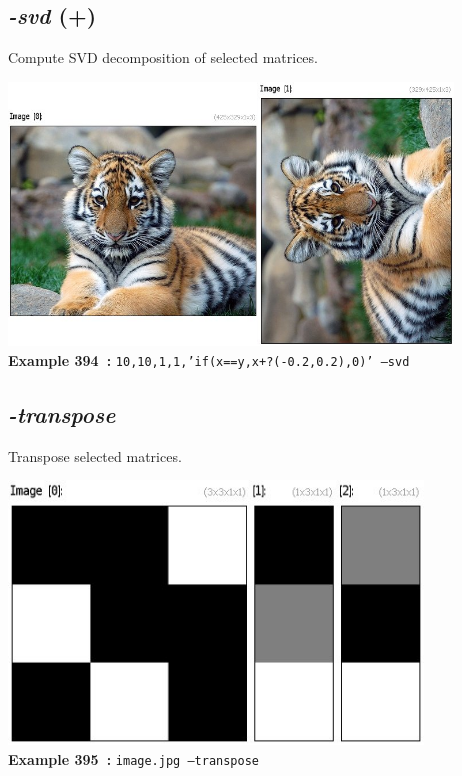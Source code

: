 \documentclass[a4paper,11pt,twoside]{book}
\begin{document}
\subsection{\emph{-svd} (+)}\vspace*{-0.5em}
Compute SVD decomposition of selected matrices.
\begin{center}\includegraphics[keepaspectratio=true,height=7cm,width=\textwidth]{img/gmic_def394.jpg}\\
{\footnotesize \textbf{Example 394~:} \texttt{10,10,1,1,'if(x==y,x+?(-0.2,0.2),0)' --svd}}
\end{center}

\subsection{\emph{-transpose} }\vspace*{-0.5em}
Transpose selected matrices.
\begin{center}\includegraphics[keepaspectratio=true,height=7cm,width=\textwidth]{img/gmic_def395.jpg}\\
{\footnotesize \textbf{Example 395~:} \texttt{image.jpg --transpose}}
\end{center}
\end{document}
